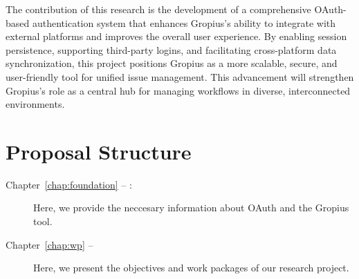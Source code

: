 The contribution of this research is the development of a comprehensive OAuth-based authentication system that enhances Gropius’s ability to integrate with external platforms and improves the overall user experience.
By enabling session persistence, supporting third-party logins, and facilitating cross-platform data synchronization,
this project positions Gropius as a more scalable, secure, and user-friendly tool for unified issue management.
This advancement will strengthen Gropius’s role as a central hub for managing workflows in diverse, interconnected environments.




\section*{Proposal Structure}
\begin{description}
	\item[Chapter~\ref{chap:foundation} -- :] Here, we provide the neccesary information about OAuth and the Gropius tool.
	\item[Chapter~\ref{chap:wp} -- ] Here, we present the objectives and work packages of our research project.
\end{description}






